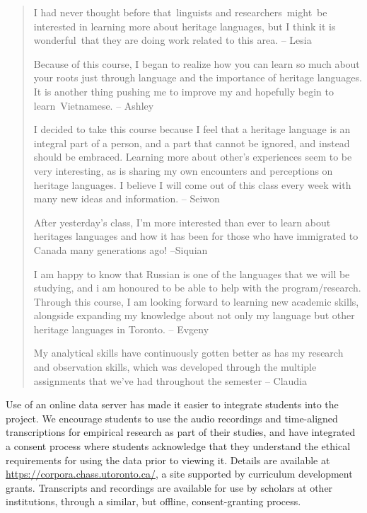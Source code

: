 \documentclass[output=paper]{LSP/langsci}
\begin{document}
\begin{quote}
I had never thought before that~linguists and researchers~might~be interested in learning more about heritage languages, but I think it is wonderful~that they are doing work related to this area. – Lesia

Because of this course, I began to realize how you can learn so much about your roots just through language and the importance of heritage languages. It is another thing pushing me to improve my  and hopefully begin to learn~Vietnamese. – Ashley

 I decided to take this course because I feel that a heritage language is an integral part of a person, and a part that cannot be ignored, and instead should be embraced. Learning more about other’s experiences seem to be very interesting, as is sharing my own encounters and perceptions on heritage languages. I believe I will come out of this class every week with many new ideas and information. – Seiwon

After yesterday's class, I'm more interested than ever to learn about heritages languages and how it has been for those who have immigrated to Canada many generations ago! –Siquian

I am happy to know that Russian is one of the languages that we will be studying, and i am honoured to be able to help with the program/research. Through this course, I am looking forward to learning new academic skills, alongside expanding my knowledge about not only my language but other heritage languages in Toronto. – Evgeny

My analytical skills have continuously gotten better as has my research and observation skills, which was developed through the multiple assignments that we've had throughout the semester – Claudia
\end{quote}

Use of an online data server has made it easier to integrate students into the project. We encourage students to use the audio recordings and time-aligned transcriptions for empirical research as part of their studies, and have integrated a consent process where students acknowledge that they understand the ethical requirements for using the data prior to viewing it. Details are available at \url{https://corpora.chass.utoronto.ca/}, a site supported by curriculum development grants. Transcripts and recordings are available for use by scholars at other institutions, through a similar, but offline, consent-granting process.
\end{document}
